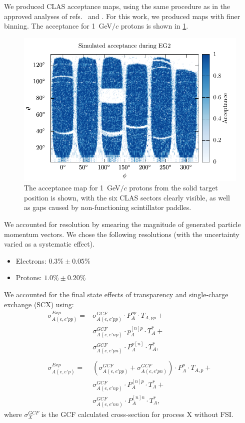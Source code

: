 \documentclass{article}
\begin{document}
We produced CLAS acceptance maps, using the same procedure
as in the approved analyses of refs.~\cite{Meytal:note} and \cite{Erez:note}. 
For this work, we produced maps with finer binning. The acceptance for 
1~GeV$/c$ protons is shown in \ref{fig:maps}.

\begin{figure}[htpb]
\centering
\includegraphics{maps.pdf}
\caption[Acceptance Map]{The acceptance map for 1~GeV$/c$ protons from the solid target position is shown,
with the six CLAS sectors clearly visible, as well as gaps caused by non-functioning
scintillator paddles.
\label{fig:maps}
}
\end{figure}

We accounted for resolution by smearing the magnitude of generated particle momentum vectors.
We chose the following resolutions (with the uncertainty varied as a systematic effect).
\begin{itemize}
\item Electrons: $0.3\% \pm 0.05\%$
\item Protons: $1.0\% \pm 0.20\%$
\end{itemize}

We accounted for the final state effects of transparency and single-charge exchange (SCX)
using:
\begin{equation}
\begin{split}
\sigma^{Exp}_{A(e,e'pp)} = &\sigma^{GCF}_{A(e,e'pp)} \cdot P_{A}^{pp}\cdot T_{A,pp} + \\
 & \sigma^{GCF}_{A(e,e'np)}\cdot p_{A}^{[n]p}\cdot T_{A}^{*} + \\
 & \sigma^{GCF}_{A(e,e'pn)}\cdot P_{A}^{p[n]}\cdot T_{A}^{*}, \\ \\
\sigma^{Exp}_{A(e,e'p)} = & (\sigma^{GCF}_{A(e,e'pp)} + \sigma^{GCF}_{A(e,e'pn)}) \cdot P_{A}^{p}\cdot T_{A,p} + \\
 & \sigma^{GCF}_{A(e,e'np)} \cdot P_{A}^{[n]p}\cdot T_{A}^{*} + \\
 &\sigma^{GCF}_{A(e,e'nn)}\cdot P_{A}^{[n]n}\cdot T_{A}^{*},
\end{split}
\label{eq:scx_gcf}
\end{equation}
where $\sigma^{GCF}_{X}$ is the GCF calculated cross-section for process X without FSI.
\end{document}
